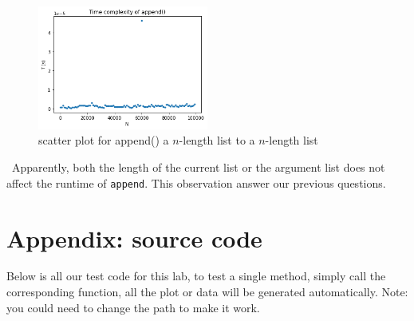 \documentclass[12pt]{article}
\begin{document}
\begin{figure}[h!]
\centering
\includegraphics[width=0.5\textwidth,height=\textheight,keepaspectratio]{figure_7.png}
\caption{scatter plot for append() a $n$-length list to a $n$-length list}
\label{Figure: 7}
\end{figure}
\newpage ~\newline\noindent Apparently, both the length of the current list or the argument list does not affect the runtime of \verb|append|. This observation answer our previous questions.

\newpage

\lstset{language=Python, basicstyle=\tiny, breaklines=true, showspaces=false,
  showstringspaces=false, breakatwhitespace=true}

\section*{Appendix: source code}
Below is all our test code for this lab, to test a single method, simply call the corresponding function, all the plot or data will be generated automatically. Note: you could need to change the path to make it work.
\noindent 
\end{document}
